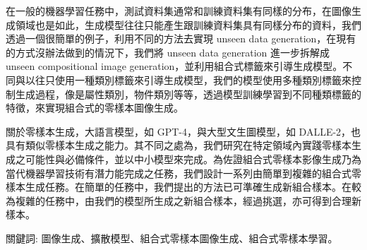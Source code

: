 \begin{abstractzh}%

在一般的機器學習任務中，測試資料集通常和訓練資料集有同樣的分布，在圖像生成領域也是如此，生成模型往往只能產生跟訓練資料集具有同樣分布的資料，我們透過一個很簡單的例子，利用不同的方法去實現 unseen data generation，在現有的方式沒辦法做到的情況下，我們將 unseen data generation 進一步拆解成 unseen compositional image generation，並利用組合式標籤來引導生成模型。不同與以往只使用一種類別標籤來引導生成模型，我們的模型使用多種類別標籤來控制生成過程，像是屬性類別，物件類別等等，透過模型訓練學習到不同種類標籤的特徵，來實現組合式的零樣本圖像生成。

關於零樣本生成，大語言模型，如 GPT-4，與大型文生圖模型，如 DALLE-2，也具有類似零樣本生成之能力。其不同之處為，我們研究在特定領域內實踐零樣本生成之可能性與必備條件，並以中小模型來完成。為佐證組合式零樣本影像生成乃為當代機器學習技術有潛力能完成之任務，我們設計一系列由簡單到複雜的組合式零樣本生成任務。在簡單的任務中，我們提出的方法已可準確生成新組合樣本。在較為複雜的任務中，由我們的模型所生成之新組合樣本，經過挑選，亦可得到合理新樣本。

\vspace{17cm}

關鍵詞: 圖像生成、擴散模型、組合式零樣本圖像生成、組合式零樣本學習。

\end{abstractzh}